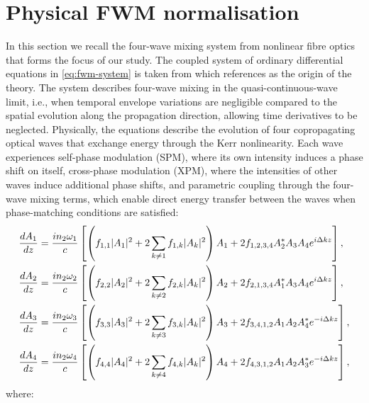 \documentclass[11pt,a4paper]{article}
\begin{document}
\section{Physical FWM normalisation}\label{supp:sec:physical}
In this section we recall the four-wave mixing system from nonlinear fibre optics that forms the focus of our study.
The coupled system of ordinary differential equations in \eqref{eq:fwm-system} is taken from \cite{agrawalNonlinearFiberOptics2019} which references \cite{stolenParametricAmplificationFrequency1982} as the origin of the theory.
The system describes four-wave mixing in the quasi-continuous-wave limit, i.e., when temporal envelope variations are negligible compared to the spatial evolution along the propagation direction, allowing time derivatives to be neglected.
Physically, the equations describe the evolution of four copropagating optical waves that exchange energy through the Kerr nonlinearity.
Each wave experiences self-phase modulation (SPM), where its own intensity induces a phase shift on itself, cross-phase modulation (XPM), where the intensities of other waves induce additional phase shifts, and parametric coupling through the four-wave mixing terms, which enable direct energy transfer between the waves when phase-matching conditions are satisfied:
\begin{align}
\frac{dA_1}{dz} &= \frac{in_2\omega_1}{c}\left[\left(f_{1,1}|A_1|^2 + 2\sum_{k\neq 1} f_{1,k}|A_k|^2\right)A_1 + 2f_{1,2,3,4}A_2^*A_3A_4e^{i\Delta kz}\right], \notag \\
\frac{dA_2}{dz} &= \frac{in_2\omega_2}{c}\left[\left(f_{2,2}|A_2|^2 + 2\sum_{k\neq 2} f_{2,k}|A_k|^2\right)A_2 + 2f_{2,1,3,4}A_1^*A_3A_4e^{i\Delta kz}\right], \notag \\
\frac{dA_3}{dz} &= \frac{in_2\omega_3}{c}\left[\left(f_{3,3}|A_3|^2 + 2\sum_{k\neq 3} f_{3,k}|A_k|^2\right)A_3 + 2f_{3,4,1,2}A_1A_2A_4^*e^{-i\Delta kz}\right], \notag \\
\frac{dA_4}{dz} &= \frac{in_2\omega_4}{c}\left[\left(f_{4,4}|A_4|^2 + 2\sum_{k\neq 4} f_{4,k}|A_k|^2\right)A_4 + 2f_{4,3,1,2}A_1A_2A_3^*e^{-i\Delta kz}\right], \label{eq:fwm-system}
\end{align}
where:
\end{document}
